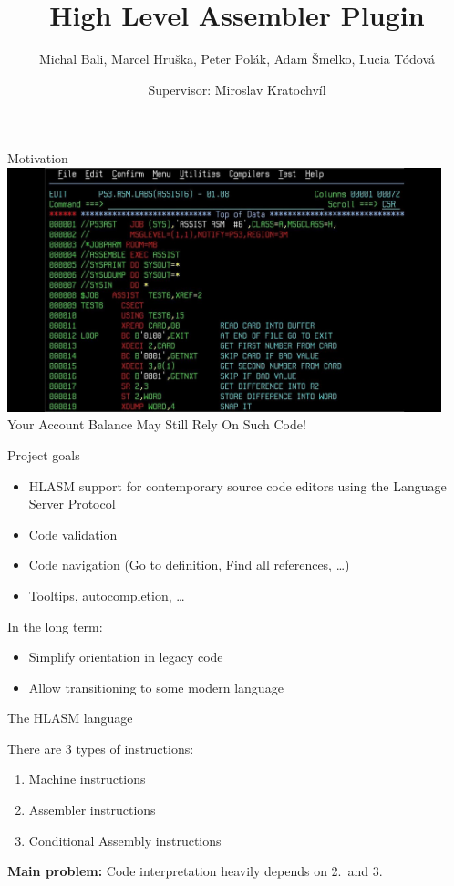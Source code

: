 \documentclass[10pt]{beamer}
\title{High Level Assembler Plugin}
\date{Supervisor: Miroslav Kratochvíl}
\author{Michal Bali, Marcel Hruška, Peter Polák, Adam Šmelko, Lucia Tódová}
\begin{document}
\maketitle


\begin{frame}[standout]{Motivation}
\centering
\hspace*{-1cm}
\includegraphics[width=12.6cm]{img/maxresdefault}
\pause
\footnotesize Your Account Balance May Still Rely On Such Code!

\end{frame}

\begin{frame}{Project goals}
    \begin{itemize}
    	\item HLASM support for contemporary source code editors using the Language Server Protocol
    	\item Code validation
    	\item Code navigation (Go to definition, Find all references, \dots)
    	\item Tooltips, autocompletion, \dots
    \end{itemize}

    In the long term:
    \begin{itemize}
        \item Simplify orientation in legacy code
        \item Allow transitioning to some modern language %
    \end{itemize}
\end{frame}


\begin{frame}{The HLASM language}

There are 3 types of instructions:
\begin{enumerate}
	\item Machine instructions
	\item Assembler instructions \\
	\item Conditional Assembly instructions \\
\end{enumerate}

\textbf{Main problem:} Code interpretation heavily depends on 2.~and 3.

\end{frame}
\end{document}
